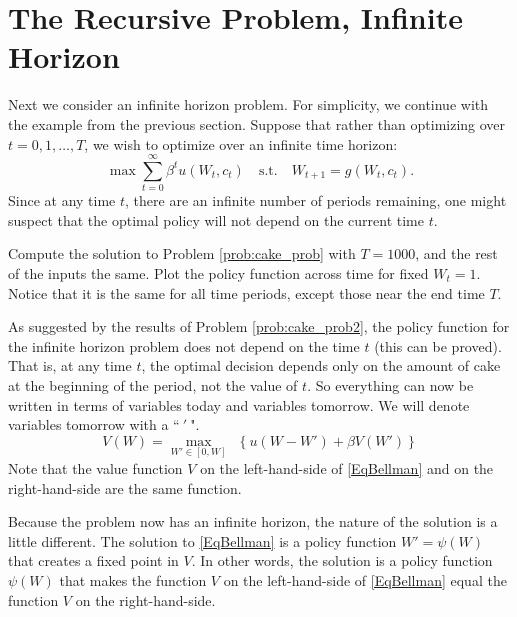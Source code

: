 \section*{The Recursive Problem, Infinite Horizon}\label{SecRecProbInFHor}
Next we consider an infinite horizon problem.  For simplicity, we continue with the example from the previous section.
Suppose that rather than optimizing over $t = 0,1,\ldots,T$, we wish to optimize over an infinite time horizon:
\begin{equation*}
\max \sum_{t=0}^\infty \beta^t u(W_t,c_t) \quad \text{s.t.} \quad W_{t+1} = g(W_t,c_t).
\end{equation*}
Since at any time $t$, there are an infinite number of periods remaining, one might suspect that the optimal policy will
not depend on the current time $t$.

\begin{problem}
\label{prob:cake_prob2}
Compute the solution to Problem \ref{prob:cake_prob} with $T = 1000$, and the rest of the inputs the same.
Plot the policy function across time for fixed $W_t = 1$.
Notice that it is the same for all time periods, except those near the end time $T$.
\end{problem}

As suggested by the results of Problem \ref{prob:cake_prob2},  the policy function for the infinite horizon problem does not
depend on the time $t$ (this can be proved).  That is, at any time $t$, the optimal decision depends only on the amount of cake
at the beginning of the period, not the value of $t$.  So everything can now be written in terms of variables today and variables
tomorrow. We will denote variables tomorrow with a ``$\:'\:$".
\begin{equation}
\label{EqBellman}
V\left(W\right) = \max_{W'\in[0,W]}\:\: \left\{u\left(W - W'\right) + \beta V\left(W'\right)\right\}
\end{equation}
Note that the value function $V$ on the left-hand-side of \eqref{EqBellman} and on the right-hand-side are the same function.

Because the problem now has an infinite horizon, the nature of the solution is a little different. The solution to \eqref{EqBellman}
is a policy function $W'=\psi(W)$ that creates a fixed point in $V$. In other words, the solution is a policy function $\psi(W)$
that makes the function $V$ on the left-hand-side of \eqref{EqBellman} equal the function $V$ on the right-hand-side.


